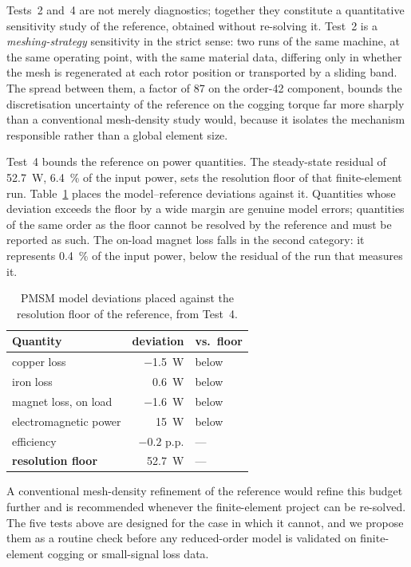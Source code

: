 \documentclass[10pt,a4paper,twocolumn]{article}
\theoremstyle{plain}
\theoremstyle{remark}
\begin{document}
Tests~2 and~4 are not merely diagnostics; together they constitute a
quantitative sensitivity study of the reference, obtained without
re-solving it. Test~2 is a \emph{meshing-strategy} sensitivity in the
strict sense: two runs of the same machine, at the same operating point,
with the same material data, differing only in whether the mesh is
regenerated at each rotor position or transported by a sliding band. The
spread between them, a factor of 87 on the order-42 component, bounds
the discretisation uncertainty of the reference on the cogging torque
far more sharply than a conventional mesh-density study would, because
it isolates the mechanism responsible rather than a global element
size.

Test~4 bounds the reference on power quantities. The steady-state
residual of \SI{52.7}{\watt}, \SI{6.4}{\percent} of the input power,
sets the resolution floor of that finite-element run.
Table~\ref{tab:unc} places the model--reference deviations against it.
Quantities whose deviation exceeds the floor by a wide margin are
genuine model errors; quantities of the same order as the floor cannot
be resolved by the reference and must be reported as such. The on-load
magnet loss falls in the second category: it represents
\SI{0.4}{\percent} of the input power, below the residual of the run
that measures it.

\begin{table}[!ht]
\centering
\footnotesize
\begin{tabular}{lrl}
\toprule
Quantity & deviation & vs.\ floor \\
\midrule
copper loss                 & \SI{-1.5}{\watt} & below \\
iron loss                   & \SI{+0.6}{\watt} & below \\
magnet loss, on load        & \SI{-1.6}{\watt} & below \\
electromagnetic power       & \SI{+15}{\watt}  & below \\
efficiency                  & $-0.2$ p.p.      & --- \\
\midrule
\textbf{resolution floor}   & \SI{52.7}{\watt} & --- \\
\bottomrule
\end{tabular}
\caption{PMSM model deviations placed against the resolution floor of
the reference, from Test~4.}
\label{tab:unc}
\end{table}

A conventional mesh-density refinement of the reference would refine
this budget further and is recommended whenever the finite-element
project can be re-solved. The five tests above are designed for the case
in which it cannot, and we propose them as a routine check before any
reduced-order model is validated on finite-element cogging or
small-signal loss data.
\end{document}
